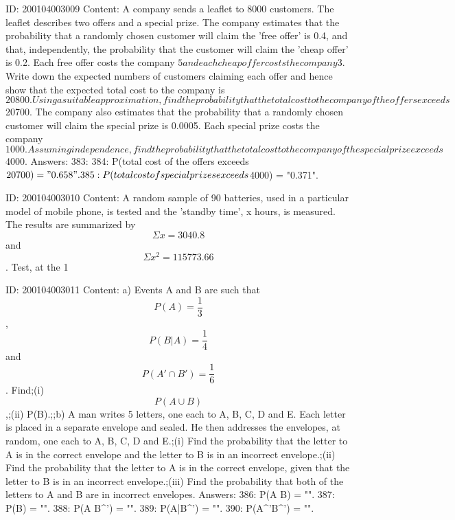 \documentclass{article}
\begin{document}
ID: 200104003009
Content:
A company sends a leaflet to 8000 customers. The leaflet describes two offers and a special prize. The company estimates that the probability that a randomly chosen customer will claim the 'free offer' is 0.4, and that, independently, the probability that the customer will claim the 'cheap offer' is 0.2. Each free offer costs the company $5 and each cheap offer costs the company $3. Write down the expected numbers of customers claiming each offer and hence show that the expected total cost to the company is $20800. Using a suitable approximation, find the probability that the total cost to the company of the offers exceeds $20700. The company also estimates that the probability that a randomly chosen customer will claim the special prize is 0.0005. Each special prize costs the company $1000. Assuming independence, find the probability that the total cost to the company of the special prize exceeds $4000. Answers:
383: 
384: P(total cost of the offers exceeds $20700) = "0.658".
385: P(total cost of special prizes exceeds $4000) = "0.371".

ID: 200104003010
Content:
A random sample of 90 batteries, used in a particular model of mobile phone, is tested and the 'standby time', x hours, is measured. The results are summarized by $$\Sigma x=3040.8$$ and $$\Sigma x^2 = 115773.66$$. Test, at the 1%

ID: 200104003011
Content:
a)  Events A and B are such that  $$P(A) = \frac{1}{3}$$,  $$P(B|A) = \frac{1}{4}$$ and  $$P( A' \cap B' ) = \frac{1}{6}$$. Find;(i)  $$P( A \cup B )$$,;(ii) P(B).;;b) A man writes 5 letters, one each to A, B, C, D and E. Each letter is placed in a separate envelope and sealed. He then addresses the envelopes, at random, one each to A, B, C, D and E.;(i) Find the probability that the letter to A is in the correct envelope and the letter to B is in an incorrect envelope.;(ii) Find the probability that the letter to A is in the correct envelope, given that the letter to B is in an incorrect envelope.;(iii) Find the probability that both of the letters to A and B are in incorrect envelopes.  Answers:
386: P(A \cup B) = "".
387: P(B) = "".
388: P(A \cap B^{'}) = "".
389: P(A|B^{'}) = "".
390: P(A^{'}\cap B^{'}) = "".
\end{document}
